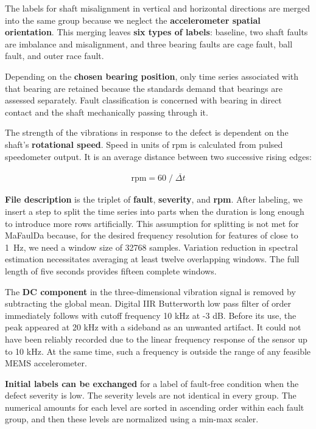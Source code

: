 The labels for shaft misalignment in vertical and horizontal directions are merged into the same group because we neglect the \textbf{accelerometer spatial orientation}. This merging leaves \textbf{six types of labels}: baseline, two shaft faults are imbalance and misalignment, and three bearing faults are cage fault, ball fault, and outer race fault.

Depending on the \textbf{chosen bearing position}, only time series associated with that bearing are retained because the standards demand that bearings are assessed separately. Fault classification is concerned with bearing in direct contact and the shaft mechanically passing through it.

The strength of the vibrations in response to the defect is dependent on the shaft's \textbf{rotational speed}. Speed in units of rpm is calculated from pulsed speedometer output. It is an average distance between two successive rising edges:
\begin{ceqn}\begin{align}
\mathrm{rpm} = 60 \;/\; \overline{\Delta t}
\end{align}\end{ceqn}

\textbf{File description} is the triplet of \textbf{fault}, \textbf{severity}, and \textbf{rpm}. After labeling, we insert a step to split the time series into parts when the duration is long enough to introduce more rows artificially. This assumption for splitting is not met for MaFaulDa because, for the desired frequency resolution for features of close to 1~Hz, we need a window size of 32768 samples. Variation reduction in spectral estimation necessitates averaging at least twelve overlapping windows. The full length of five seconds provides fifteen complete windows.

The \textbf{DC component} in the three-dimensional vibration signal is removed by subtracting the global mean. Digital IIR Butterworth low pass filter of  order immediately follows with cutoff frequency 10 kHz at -3 dB. Before its use, the peak appeared at 20 kHz with a sideband as an unwanted artifact. It could not have been reliably recorded due to the linear frequency response of the sensor up to 10 kHz. At the same time, such a frequency is outside the range of any feasible MEMS accelerometer.

\textbf{Initial labels can be exchanged} for a label of fault-free condition when the defect severity is low. The severity levels are not identical in every group. The numerical amounts for each level are sorted in ascending order within each fault group, and then these levels are normalized using a min-max scaler.

